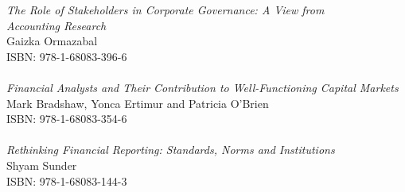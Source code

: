 \vspace{12pt}
\noindent \textit{The Role of Stakeholders in Corporate Governance: A View from\\ Accounting Research}\\
Gaizka Ormazabal
\\ISBN: 978-1-68083-396-6
\\
\\
\noindent \textit{Financial Analysts and Their Contribution to Well-Functioning Capital Markets}\\
Mark Bradshaw, Yonca Ertimur and Patricia O'Brien
\\ISBN: 978-1-68083-354-6
\\
\\
\noindent \textit{Rethinking Financial Reporting: Standards, Norms and Institutions}\\
Shyam Sunder
\\ISBN: 978-1-68083-144-3
